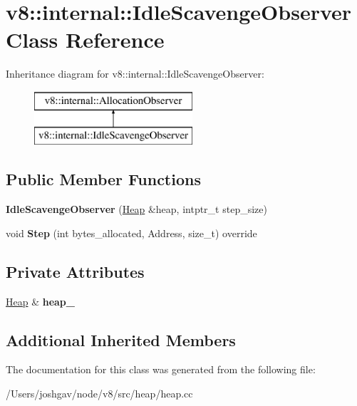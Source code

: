 \hypertarget{classv8_1_1internal_1_1_idle_scavenge_observer}{}\section{v8\+:\+:internal\+:\+:Idle\+Scavenge\+Observer Class Reference}
\label{classv8_1_1internal_1_1_idle_scavenge_observer}
Inheritance diagram for v8\+:\+:internal\+:\+:Idle\+Scavenge\+Observer\+:\begin{figure}[H]
\begin{center}
\leavevmode
\includegraphics[height=2.000000cm]{classv8_1_1internal_1_1_idle_scavenge_observer}
\end{center}
\end{figure}
\subsection*{Public Member Functions}
\begin{DoxyCompactItemize}
\item 
{\bfseries Idle\+Scavenge\+Observer} (\hyperlink{classv8_1_1internal_1_1_heap}{Heap} \&heap, intptr\+\_\+t step\+\_\+size)\hypertarget{classv8_1_1internal_1_1_idle_scavenge_observer_aa8d090884dd90df60db6bdf24c91ce72}{}\label{classv8_1_1internal_1_1_idle_scavenge_observer_aa8d090884dd90df60db6bdf24c91ce72}

\item 
void {\bfseries Step} (int bytes\+\_\+allocated, Address, size\+\_\+t) override\hypertarget{classv8_1_1internal_1_1_idle_scavenge_observer_ac883860cf00cf968e03c9161cad216d5}{}\label{classv8_1_1internal_1_1_idle_scavenge_observer_ac883860cf00cf968e03c9161cad216d5}

\end{DoxyCompactItemize}
\subsection*{Private Attributes}
\begin{DoxyCompactItemize}
\item 
\hyperlink{classv8_1_1internal_1_1_heap}{Heap} \& {\bfseries heap\+\_\+}\hypertarget{classv8_1_1internal_1_1_idle_scavenge_observer_abfe6b52e2156a729a7852b0ea12b6db6}{}\label{classv8_1_1internal_1_1_idle_scavenge_observer_abfe6b52e2156a729a7852b0ea12b6db6}

\end{DoxyCompactItemize}
\subsection*{Additional Inherited Members}


The documentation for this class was generated from the following file\+:\begin{DoxyCompactItemize}
\item 
/\+Users/joshgav/node/v8/src/heap/heap.\+cc\end{DoxyCompactItemize}
